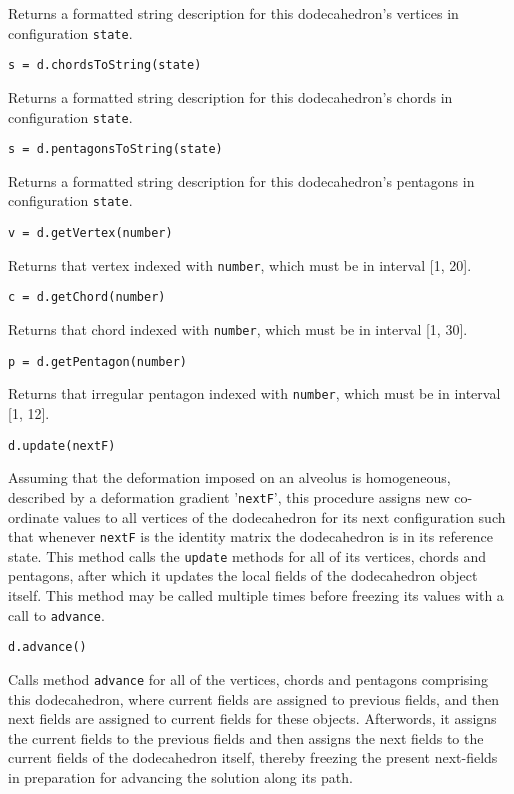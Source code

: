 \medskip\noindent
Returns a formatted string description for this dodecahedron's vertices in configuration \texttt{state}.

\medskip\noindent
\texttt{s = d.chordsToString(state)}

\medskip\noindent
Returns a formatted string description for this dodecahedron's chords in configuration \texttt{state}.

\medskip\noindent
\texttt{s = d.pentagonsToString(state)}

\medskip\noindent
Returns a formatted string description for this dodecahedron's pentagons in configuration \texttt{state}.

\medskip\noindent
\texttt{v = d.getVertex(number)}

\medskip\noindent
Returns that vertex indexed with \texttt{number}, which must be in interval [1, 20].

\medskip\noindent
\texttt{c = d.getChord(number)}

\medskip\noindent
Returns that chord indexed with \texttt{number}, which must be in interval [1, 30].

\medskip\noindent
\texttt{p = d.getPentagon(number)}

\medskip\noindent
Returns that irregular pentagon indexed with \texttt{number}, which must be in interval [1, 12].

\newpage
\medskip\noindent
\texttt{d.update(nextF)}

\medskip\noindent
Assuming that the deformation imposed on an alveolus is homogeneous, described by a deformation gradient '\texttt{nextF}', this procedure assigns new co-ordinate values to all vertices of the dodecahedron for its next configuration such that whenever \texttt{nextF} is the identity matrix the dodecahedron is in its reference state.  This method calls the \texttt{update} methods for all of its vertices, chords and pentagons, after which it updates the local fields of the dodecahedron object itself.  This method may be called multiple times before freezing its values with a call to \texttt{advance}.

\medskip\noindent
\texttt{d.advance()}

\medskip\noindent
Calls method \texttt{advance} for all of the vertices, chords and pentagons comprising this dodecahedron, where current fields are assigned to previous fields, and then next fields are assigned to current fields for these objects.  Afterwords, it assigns the current fields to the previous fields and then assigns the next fields to the current fields of the dodecahedron itself, thereby freezing the present next-fields in preparation for advancing the solution along its path.

